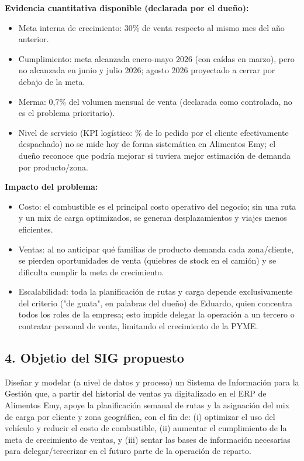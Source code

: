 \documentclass[10pt,a4paper]{article}
\begin{document}
\vspace{0.3cm}

\textbf{Evidencia cuantitativa disponible (declarada por el dueño):}
\begin{itemize}[leftmargin=1.2cm]
    \item Meta interna de crecimiento: 30\% de venta respecto al mismo mes del año anterior.
    \item Cumplimiento: meta alcanzada enero-mayo 2026 (con caídas en marzo), pero no alcanzada en junio y julio 2026; agosto 2026 proyectado a cerrar por debajo de la meta.  
    \item Merma: 0,7\% del volumen mensual de venta (declarada como controlada, no es el problema prioritario).
    \item Nivel de servicio (KPI logístico: \% de lo pedido por el cliente efectivamente despachado) no se mide hoy de forma sistemática en Alimentos Emy; el dueño reconoce que podría mejorar si tuviera mejor estimación de demanda por producto/zona.
    
\end{itemize}

\textbf{Impacto del problema:}
\begin{itemize}[leftmargin=1.2cm]
    \item Costo: el combustible es el principal costo operativo del negocio; sin una ruta y un mix de carga optimizados, se generan desplazamientos y viajes menos eficientes.
    \item Ventas: al no anticipar qué familias de producto demanda cada zona/cliente, se pierden oportunidades de venta (quiebres de stock en el camión) y se dificulta cumplir la meta de crecimiento. 
    \item Escalabilidad: toda la planificación de rutas y carga depende exclusivamente del criterio ("de guata", en palabras del dueño) de Eduardo, quien concentra todos los roles de la empresa; esto impide delegar la operación a un tercero o contratar personal de venta, limitando el crecimiento de la PYME.
    
\end{itemize}

\subsection*{4. Objetio del SIG propuesto}

Diseñar y modelar (a nivel de datos y proceso) un Sistema de Información para la Gestión que, a partir del historial de ventas ya digitalizado en el ERP de Alimentos Emy, apoye la planificación semanal de rutas y la asignación del mix de carga por cliente y zona geográfica, con el fin de: (i) optimizar el uso del vehículo y reducir el costo de combustible, (ii) aumentar el cumplimiento de la meta de crecimiento de ventas, y (iii) sentar las bases de información necesarias para delegar/tercerizar en el futuro parte de la operación de reparto.
\end{document}
